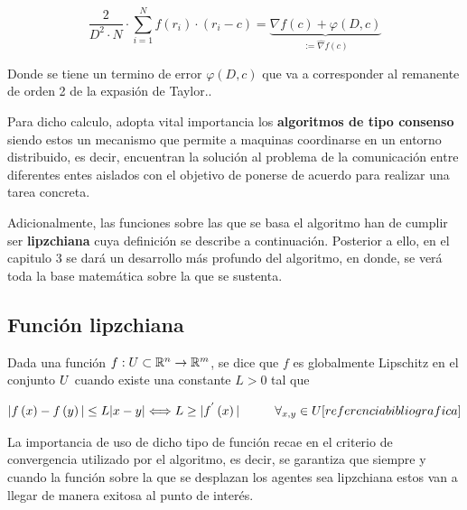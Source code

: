 \begin{equation*}
	\frac{2}{{D}^2\cdot{N}}\cdot\sum_{i=1}^{N}f(r_{i})\cdot(r_{i}-c)=\underbrace{\nabla{f}\left(c\right) + \varphi\left(D,c\right)}_{:=\hat{\nabla}{f}\left(c\right)}
\end{equation*}

Donde se tiene un termino de error $\varphi\left(D,c\right)$ que va a corresponder al remanente de orden 2 de la expasión de Taylor..

Para dicho calculo, adopta vital importancia los \textbf{algoritmos de tipo consenso} siendo estos un mecanismo que permite a maquinas coordinarse en un entorno distribuido, es decir, encuentran la solución al problema de la comunicación entre diferentes entes aislados con el objetivo de ponerse de acuerdo para realizar una tarea concreta.

Adicionalmente, las funciones sobre las que se basa el algoritmo han de cumplir ser \textbf{lipzchiana} cuya definición se describe a continuación. Posterior a ello, en el capitulo 3 se dará un desarrollo más profundo del algoritmo, en donde, se verá toda la base matemática sobre la que se sustenta.

\subsection{Función lipzchiana}

Dada una función $f:\mathnormal{U}\subset\mathbb{R}^{n}\rightarrow\mathbb{R}^{m}$, se dice que $f$ es globalmente Lipschitz en el conjunto $\mathnormal{U}$ cuando existe una constante $L>{0}$ tal que 

\begin{equation*}
	|f\left(x\right)-f\left(y\right)|\leq\mathnormal{L}|x-y|\Longleftrightarrow\mathnormal{L}\geq|f^{'}\left(x\right)|\hspace{10mm}\forall_{x,y}\in\mathnormal{U} [referencia bibliografica]
\end{equation*}

La importancia de uso de dicho tipo de función recae en el criterio de convergencia utilizado por el algoritmo, es decir, se garantiza que siempre y cuando la función sobre la que se desplazan los agentes sea lipzchiana estos van a llegar de manera exitosa al punto de interés.\\

